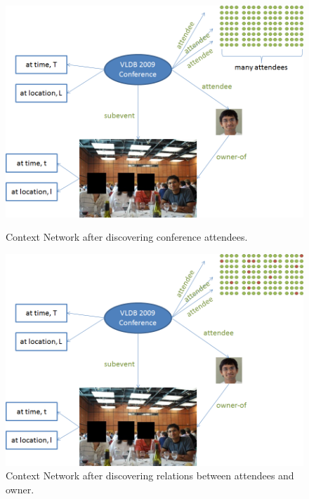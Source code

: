 \begin{figure}[h]
\begin{minipage}[b]{0.5\linewidth}
\centering
\includegraphics[width=\textwidth]{media/chapter4/stacktrace/vldb-network-4.png}
\caption{Context Network after discovering conference attendees.}
\label{fig:vldb-network-4}
\end{minipage}
\hspace{0.5cm}
\begin{minipage}[b]{0.5\linewidth}
\centering
\includegraphics[width=\textwidth]{media/chapter4/stacktrace/vldb-network-5.png}
\caption{Context Network after discovering relations between attendees and owner.}
\label{fig:vldb-network-5}
\end{minipage}
\end{figure}

